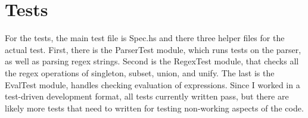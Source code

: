 \documentclass[letterpaper, 11pt]{article}
\begin{document}
\section{Tests}\label{sec:tests}
For the tests, the main test file is Spec.hs and there three helper files for the actual test. 
First, there is the ParserTest module, which runs tests on the parser, as well as parsing regex strings. 
Second is the RegexTest module, that checks all the regex operations of singleton, subset, union, and unify.
The last is the EvalTest module, handles checking evaluation of expressions.
Since I worked in a test-driven development format, all tests currently written pass, but there are likely more tests that need to written for testing non-working aspects of the code.


\end{document}
